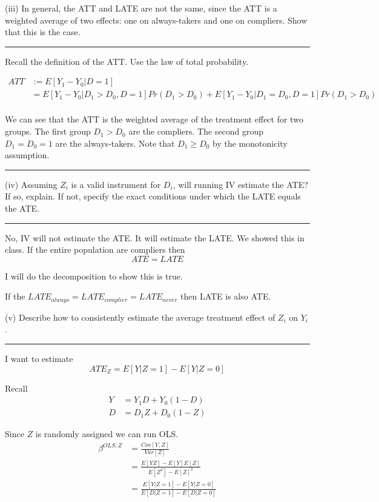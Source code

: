\documentclass{article}
\begin{document}
(iii) In general, the ATT and LATE
are not the same, since the ATT is a weighted average of two effects:
one on always-takers and one on compliers. Show that this is the case. 

\rule[0.5ex]{1\columnwidth}{1pt}

Recall the definition of the ATT. Use the law of total probability.

\begin{align*}
ATT & :=E\left[Y_{1}-Y_{0}|D=1\right]\\
 & =E\left[Y_{1}-Y_{0}|D_{1}>D_{0},D=1\right]Pr\left(D_{1}>D_{0}\right)+E\left[Y_{1}-Y_{0}|D_{1}=D_{0},D=1\right]Pr\left(D_{1}>D_{0}\right)\\
\end{align*}

We can see that the ATT is the weighted average of the treatment effect
for two groups. The first group $D_{1}>D_{0}$ are the compliers.
The second group $D_{1}=D_{0}=1$ are the always-takers. Note that
$D_{1}\geq D_{0}$ by the monotonicity assumption. 

\rule[0.5ex]{1\columnwidth}{1pt}

(iv) Assuming $Z_{i}$ is a valid
instrument for $D_{i}$, will running IV estimate the ATE? If so,
explain. If not, specify the exact conditions under which the LATE
equals the ATE. 

\rule[0.5ex]{1\columnwidth}{1pt}

No, IV will not estimate the ATE. It will estimate the LATE. We showed
this in class. If the entire population are compliers then 
\[
ATE=LATE
\]

I will do the decomposition to show this is true. 

If the $LATE_{always}=LATE_{complier}=LATE_{never}$ then LATE is
also ATE.

(v) Describe how to consistently estimate the average treatment effect
of $Z_{i}$ on $Y_{i}$.

\rule[0.5ex]{1\columnwidth}{1pt}

I want to estimate 
\[
ATE_{Z}=E\left[Y|Z=1\right]-E\left[Y|Z=0\right]
\]

Recall
\begin{align*}
Y & =Y_{1}D+Y_{0}\left(1-D\right)\\
D & =D_{1}Z+D_{0}\left(1-Z\right)
\end{align*}

Since $Z$ is randomly assigned we can run OLS. 
\begin{align*}
\beta^{OLS,Z} & =\frac{Cov\left[Y,Z\right]}{Var\left[Z\right]}\\
 & =\frac{E\left[YZ\right]-E\left[Y\right]E\left[Z\right]}{E\left[Z^{2}\right]-E\left[Z\right]^{2}}\\
 & =\frac{E\left[Y|Z=1\right]-E\left[Y|Z=0\right]}{E\left[D|Z=1\right]-E\left[D|Z=0\right]}
\end{align*}
\end{document}
